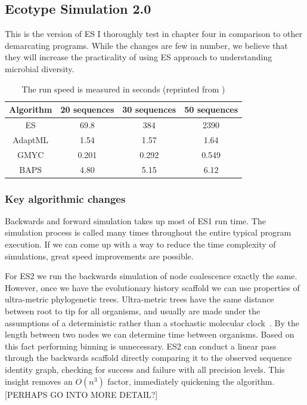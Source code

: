 \subsection*{Ecotype Simulation 2.0}
This is the version of ES I thoroughly test in chapter four in comparison to other demarcating programs.
While the changes are few in number, we believe that they will increase the practicality of using ES approach to understanding microbial diversity.

\begin{table}
 \begin{tabular}{| c | c | c | c |}
  \hline
  Algorithm & 20 sequences & 30 sequences & 50 sequences \\ \hline
  ES & 69.8 & 384 & 2390 \\
  AdaptML & 1.54 & 1.57 & 1.64 \\
  GMYC & 0.201 & 0.292 & 0.549 \\
  BAPS & 4.80 & 5.15 & 6.12 \\
  \hline
 \end{tabular}
 \caption[ES1 run-time compared to other demarcation programs.]{The run speed is measured in seconds (reprinted from \protect\cite{carlo})}
 \label{tab:ES1speed}
\end{table}

\subsubsection*{Key algorithmic changes}
Backwards and forward simulation takes up most of ES1 run time.
The simulation process is called many times throughout the entire typical program execution.
If we can come up with a way to reduce the time complexity of simulations, great speed improvements are possible.

For ES2 we run the backwards simulation of node coalescence exactly the same.
However, once we have the evolutionary history scaffold we can use properties of ultra-metric phylogenetic trees.
Ultra-metric trees have the same distance between root to tip for all organisms, and usually are made under the assumptions of a deterministic rather than a stochastic molecular clock~\cite{ho2008molecular}.
By the length between two nodes we can determine time between organisms.
Based on this fact performing binning is unnecessary.
ES2 can conduct a linear pass through the backwards scaffold directly comparing it to the observed sequence identity graph, checking for success and failure with all precision levels.
This insight removes an $O(n^3)$ factor, immediately quickening the algorithm. [PERHAPS GO INTO MORE DETAIL?]

